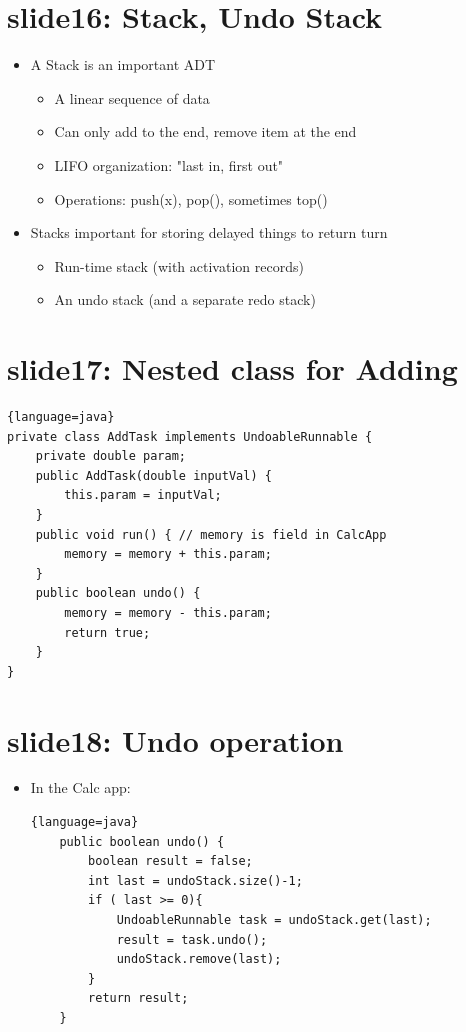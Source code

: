 \documentclass[12pt, a4paper]{book}
\begin{document}
\section{slide16: Stack, Undo Stack}
\begin{itemize}
    \item  A Stack is an important ADT
          \begin{itemize}
              \item A linear sequence of data
              \item Can only add to the end, remove item at the end
              \item LIFO organization: "last in, first out"
              \item Operations: push(x), pop(), sometimes top()
          \end{itemize}
    \item Stacks important for storing delayed things to return turn
          \begin{itemize}
              \item Run-time stack (with activation records)
              \item An undo stack (and a separate redo stack)
          \end{itemize}
\end{itemize}

\section{slide17: Nested class for Adding}
\begin{lstlisting}{language=java}
private class AddTask implements UndoableRunnable {
    private double param;
    public AddTask(double inputVal) {
        this.param = inputVal;
    }
    public void run() { // memory is field in CalcApp
        memory = memory + this.param;
    }
    public boolean undo() {
        memory = memory - this.param;
        return true;
    }
}
\end{lstlisting}

\section{slide18: Undo operation}
\begin{itemize}
    \item In the Calc app:
          \begin{lstlisting}{language=java}
    public boolean undo() {
        boolean result = false;
        int last = undoStack.size()-1;
        if ( last >= 0){
            UndoableRunnable task = undoStack.get(last);
            result = task.undo();
            undoStack.remove(last);
        }
        return result;
    }
    \end{lstlisting}
\end{itemize}
\end{document}

